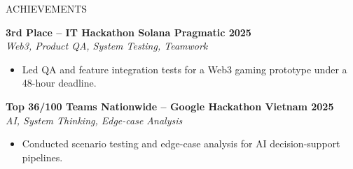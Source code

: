 \documentclass{resume}
\begin{document}
\begin{rSection}{ACHIEVEMENTS}
    \vspace{-0.6em}

    \item \textbf{3rd Place -- IT Hackathon Solana Pragmatic 2025}\\
    {\small \textit{Web3, Product QA, System Testing, Teamwork}}
    \begin{itemize}
        \itemsep -4pt {}
        \item Led QA and feature integration tests for a Web3 gaming prototype under a 48-hour deadline.
    \end{itemize}

    \item \textbf{Top 36/100 Teams Nationwide -- Google Hackathon Vietnam 2025}\\
    {\small \textit{AI, System Thinking, Edge-case Analysis}}
    \begin{itemize}
        \itemsep -4pt {}
        \item Conducted scenario testing and edge-case analysis for AI decision-support pipelines.
    \end{itemize}
\end{rSection}
\end{document}
